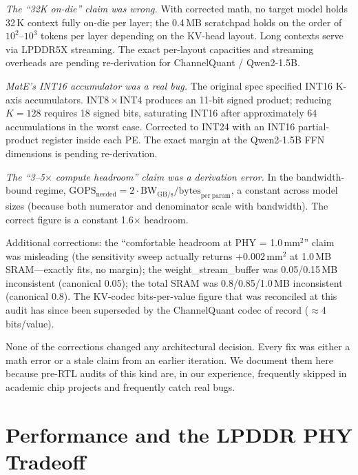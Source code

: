 \documentclass[conference]{IEEEtran}
\begin{document}
\textit{The ``32K on-die'' claim was wrong.} With corrected math, no target model holds 32\,K context fully on-die per layer; the 0.4\,MB scratchpad holds on the order of $10^2$--$10^3$ tokens per layer depending on the KV-head layout. Long contexts serve via LPDDR5X streaming. The exact per-layout capacities and streaming overheads are pending re-derivation for ChannelQuant / Qwen2-1.5B.

\textit{MatE's INT16 accumulator was a real bug.} The original spec specified INT16 K-axis accumulators. INT8\,$\times$\,INT4 produces an 11-bit signed product; reducing $K{=}128$ requires 18 signed bits, saturating INT16 after approximately 64 accumulations in the worst case. Corrected to INT24 with an INT16 partial-product register inside each PE. The exact margin at the Qwen2-1.5B FFN dimensions is pending re-derivation.

\textit{The ``3--5$\times$ compute headroom'' claim was a derivation error.} In the bandwidth-bound regime, $\mathrm{GOPS}_{\mathrm{needed}} = 2 \cdot \mathrm{BW}_{\mathrm{GB/s}} / \mathrm{bytes}_{\mathrm{per\ param}}$, a constant across model sizes (because both numerator and denominator scale with bandwidth). The correct figure is a constant 1.6$\times$ headroom.

Additional corrections: the ``comfortable headroom at PHY = 1.0\,mm$^2$'' claim was misleading (the sensitivity sweep actually returns $+0.002$\,mm$^2$ at 1.0\,MB SRAM---exactly fits, no margin); the weight\_stream\_buffer was 0.05/0.15\,MB inconsistent (canonical 0.05); the total SRAM was 0.8/0.85/1.0\,MB inconsistent (canonical 0.8). The KV-codec bits-per-value figure that was reconciled at this audit has since been superseded by the ChannelQuant codec of record ($\approx$4 bits/value).

None of the corrections changed any architectural decision. Every fix was either a math error or a stale claim from an earlier iteration. We document them here because pre-RTL audits of this kind are, in our experience, frequently skipped in academic chip projects and frequently catch real bugs.

\section{Performance and the LPDDR PHY Tradeoff}
\label{sec:performance}
\end{document}
